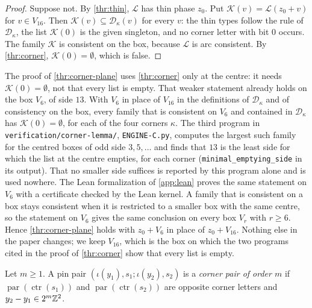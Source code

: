 \begin{proof}
Suppose not. By \cref{thr:thin}, $\mathcal L$ has thin phase $z_0$. Put $\mathcal K(v)=\mathcal L(z_0+v)$ for $v\in V_{16}$. Then $\mathcal K(v)\subseteq\mathcal D_\kappa(v)$ for every $v$: the thin types follow the rule of $\mathcal D_\kappa$, the list $\mathcal K(0)$ is the given singleton, and no corner letter with bit $0$ occurs. The family $\mathcal K$ is consistent on the box, because $\mathcal L$ is arc consistent. By \cref{thr:corner}, $\mathcal K(0)=\emptyset$, which is false.
\end{proof}

\begin{remark*}
The proof of \cref{thr:corner-plane} uses \cref{thr:corner} only at the centre: it needs $\mathcal K(0)=\emptyset$, not that every list is empty. That weaker statement already holds on the box $V_6$, of side $13$. With $V_6$ in place of $V_{16}$ in the definitions of $\mathcal D_\kappa$ and of consistency on the box, every family that is consistent on $V_6$ and contained in $\mathcal D_\kappa$ has $\mathcal K(0)=\emptyset$, for each of the four corners $\kappa$. The third program in \texttt{verification/corner-lemma/}, \texttt{ENGINE-C.py}, computes the largest such family for the centred boxes of odd side $3,5,\dots$ and finds that $13$ is the least side for which the list at the centre empties, for each corner (\texttt{minimal\_emptying\_side} in its output). That no smaller side suffices is reported by this program alone and is used nowhere. The Lean formalization of \cref{app:lean} proves the same statement on $V_6$ with a certificate checked by the Lean kernel. A family that is consistent on a box stays consistent when it is restricted to a smaller box with the same centre, so the statement on $V_6$ gives the same conclusion on every box $V_r$ with $r\ge6$. Hence \cref{thr:corner-plane} holds with $z_0+V_6$ in place of $z_0+V_{16}$. Nothing else in the paper changes; we keep $V_{16}$, which is the box on which the two programs cited in the proof of \cref{thr:corner} show that every list is empty.
\end{remark*}

\begin{definition}\label{thr:def-pair}
Let $m\ge1$. A pin pair $(\iota(y_1),s_1;\iota(y_2),s_2)$ is a \emph{corner pair of order $m$} if $\operatorname{par}(\operatorname{ctr}(s_1))$ and $\operatorname{par}(\operatorname{ctr}(s_2))$ are opposite corner letters and $y_2-y_1\in2^m\mathbb{Z}^2$.
\end{definition}

